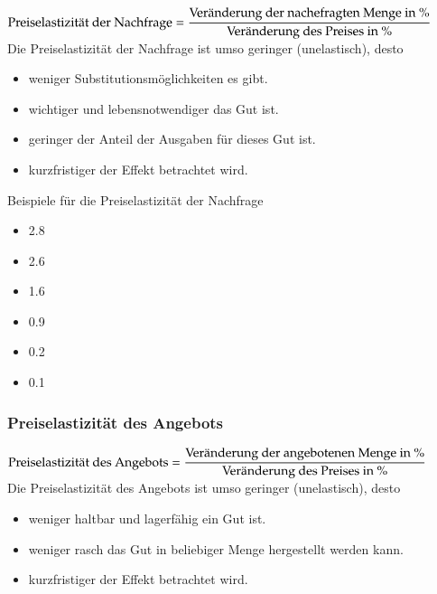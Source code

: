 \begin{minipage}{0.7\linewidth}
	$\textnormal{Preiselastizität der Nachfrage} = \dfrac{\textnormal{Veränderung der nachefragten Menge in \%}}{\textnormal{Veränderung des Preises in \%}}$\\
	\vspace{\baselineskip}
	Die Preiselastizität der Nachfrage ist umso geringer (unelastisch), desto
	\begin{itemize}
		\item weniger Substitutionsmöglichkeiten es gibt.
		\item wichtiger und lebensnotwendiger das Gut ist.
		\item geringer der Anteil der Ausgaben für dieses Gut ist.
		\item kurzfristiger der Effekt betrachtet wird.
	\end{itemize}
	\vfill\null
\end{minipage}%
\hspace{0.04\linewidth}
\begin{minipage}{0.25\linewidth}
	Beispiele für die Preiselastizität der Nachfrage
	\begin{itemize}
		\item{} 2.8
		\item{} 2.6
		\item{} 1.6
		\item{} 0.9
		\item{} 0.2
		\item{} 0.1
	\end{itemize}
\end{minipage}
\clearpage

\subsubsection{Preiselastizität des Angebots}
$\textnormal{Preiselastizität des Angebots} = \dfrac{\textnormal{Veränderung der angebotenen Menge in \%}}{\textnormal{Veränderung des Preises in \%}}$\\
\vspace{\baselineskip}
Die Preiselastizität des Angebots ist umso geringer (unelastisch), desto
\begin{itemize}
	\item weniger haltbar und lagerfähig ein Gut ist.
	\item weniger rasch das Gut in beliebiger Menge hergestellt werden kann.
	\item kurzfristiger der Effekt betrachtet wird.
\end{itemize}

